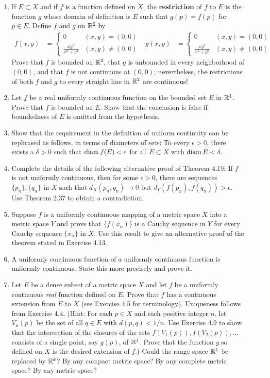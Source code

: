 \documentclass[../psets.tex]{subfiles}
\begin{document}
\begin{enumerate}[label={\textbf{\arabic*.}}]
    \item If $E\subset X$ and if $f$ is a function defined on $X$, the \textbf{restriction} of $f$ to $E$ is the function $g$ whose domain of definition is $E$ such that $g(p)=f(p)$ for $p\in E$. Define $f$ and $g$ on $\mathbb{R}^2$ by
    \begin{align*}
        f(x,y) &=
        \begin{cases}
            0 & (x,y)=(0,0)\\
            \frac{xy^2}{x^2+y^4} & (x,y)\neq(0,0)
        \end{cases}&
        g(x,y) &=
        \begin{cases}
            0 & (x,y)=(0,0)\\
            \frac{xy^2}{x^2+y^6} & (x,y)\neq(0,0)
        \end{cases}
    \end{align*}
    Prove that $f$ is bounded on $\mathbb{R}^2$, that $g$ is unbounded in every neighborhood of $(0,0)$, and that $f$ is not continuous at $(0,0)$; nevertheless, the restrictions of both $f$ and $g$ to every straight line in $\mathbb{R}^2$ are continuous!
    \item Let $f$ be a real uniformly continuous function on the bounded set $E$ in $\mathbb{R}^1$. Prove that $f$ is bounded on $E$. Show that the conclusion is false if boundedness of $E$ is omitted from the hypothesis.
    \item Show that the requirement in the definition of uniform continuity can be rephrased as follows, in terms of diameters of sets: To every $\epsilon>0$, there exists a $\delta>0$ such that $\operatorname{diam} f(E)<\epsilon$ for all $E\subset X$ with $\operatorname{diam} E<\delta$.
    \item Complete the details of the following alternative proof of Theorem 4.19: If $f$ is not uniformly continuous, then for some $\epsilon>0$, there are sequences $\{p_n\},\{q_n\}$ in $X$ such that $d_X(p_n,q_n)\to 0$ but $d_Y(f(p_n),f(q_n))>\epsilon$. Use Theorem 2.37 to obtain a contradiction.
    \item Suppose $f$ is a uniformly continuous mapping of a metric space $X$ into a metric space $Y$ and prove that $\{f(x_n)\}$ is a Cauchy sequence in $Y$ for every Cauchy sequence $\{x_n\}$ in $X$. Use this result to give an alternative proof of the theorem stated in Exercise 4.13.
    \item A uniformly continuous function of a uniformly continuous function is uniformly continuous. State this more precisely and prove it.
    \item Let $E$ be a dense subset of a metric space $X$ and let $f$ be a uniformly continuous \emph{real} function defined on $E$. Prove that $f$ has a continuous extension from $E$ to $X$ (see Exercise 4.5 for terminology). Uniqueness follows from Exercise 4.4. (Hint: For each $p\in X$ and each positive integer $n$, let $V_n(p)$ be the set of all $q\in E$ with $d(p,q)<1/n$. Use Exercise 4.9 to show that the intersection of the closures of the sets $f(V_1(p)),f(V_2(p)),\dots$ consists of a single point, say $g(p)$, of $\mathbb{R}^1$. Prove that the function $g$ so defined on $X$ is the desired extension of $f$.) Could the range space $\mathbb{R}^1$ be replaced by $\mathbb{R}^k$? By any compact metric space? By any complete metric space? By any metric space?

\end{enumerate}
\end{document}
